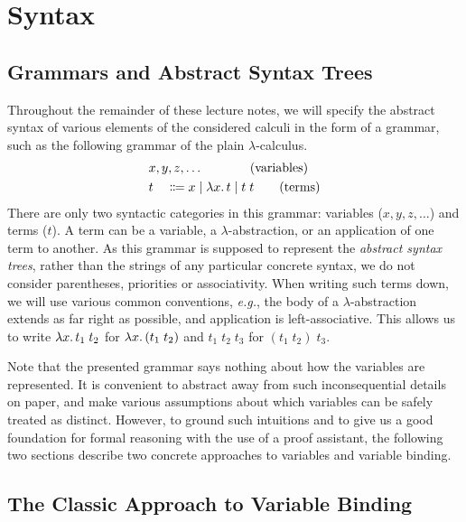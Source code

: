 \chapter{Syntax}

\section{Grammars and Abstract Syntax Trees}

Throughout the remainder of these lecture notes, we will specify the abstract
syntax of various elements of the considered calculi in the form of a grammar,
such as the following grammar of the plain $\lambda$-calculus.
\begin{alignat*}{2}
  &x, y, z, \dots \span\span \tag{variables} \\
  &t &&\Coloneqq x \mid \lambda x\ldotp t \mid t\;t \tag{terms}
\end{alignat*}
There are only two syntactic categories in this grammar: variables
($x, y, z, \dots$) and terms ($t$). A term can be a variable,
a $\lambda$-abstraction, or an application of one term to another.
As this grammar is supposed to represent the \emph{abstract syntax trees},
rather than the strings of any particular concrete syntax, we do not consider
parentheses, priorities or associativity. When writing such
terms down, we will use various common conventions, \emph{e.g.}, the
body of a $\lambda$-abstraction extends as far right as possible, and
application is left-associative. This allows us to write
$\lambda x\ldotp t_1\;t_2$ for $\lambda x\ldotp (t_1\;t_2)$
and $t_1\;t_2\;t_3$ for $(t_1\;t_2)\;t_3$.

Note that the presented grammar says nothing about how the variables are
represented. It is convenient to abstract away from such
inconsequential details on paper, and make various assumptions about which
variables can be safely treated as distinct. However, to ground such
intuitions and to give us a good foundation for formal reasoning with
the use of a proof assistant, the following two sections describe
two concrete approaches to variables and variable binding.

\section{The Classic Approach to Variable Binding}
\label{sec:syntax_classic}

